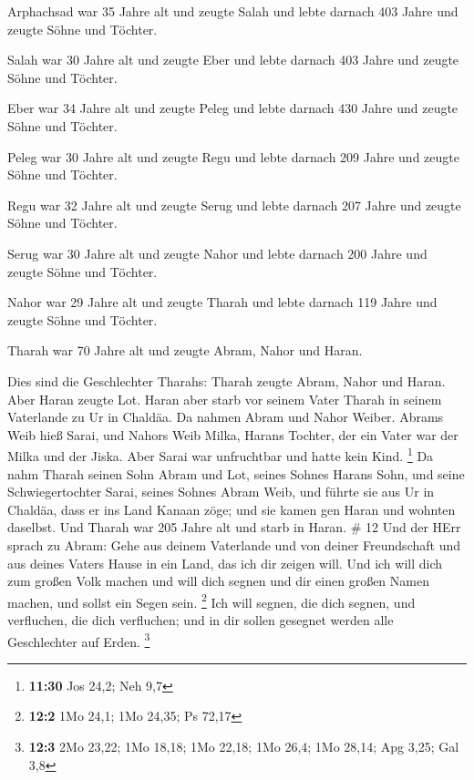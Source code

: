  Arphachsad war 35 Jahre alt und zeugte Salah 
und lebte darnach 403 Jahre und zeugte Söhne und Töchter.

 Salah war 30 Jahre alt und zeugte Eber  und
lebte darnach 403 Jahre und zeugte Söhne und Töchter.

 Eber war 34 Jahre alt und zeugte Peleg  und
lebte darnach 430 Jahre und zeugte Söhne und Töchter.

 Peleg war 30 Jahre alt und zeugte Regu  und
lebte darnach 209 Jahre und zeugte Söhne und Töchter.

 Regu war 32 Jahre alt und zeugte Serug  und
lebte darnach 207 Jahre und zeugte Söhne und Töchter.

 Serug war 30 Jahre alt und zeugte Nahor  und
lebte darnach 200 Jahre und zeugte Söhne und Töchter.

 Nahor war 29 Jahre alt und zeugte Tharah  und
lebte darnach 119 Jahre und zeugte Söhne und Töchter.

 Tharah war 70 Jahre alt und zeugte Abram, Nahor und Haran.

 Dies sind die Geschlechter Tharahs: Tharah zeugte Abram,
Nahor und Haran. Aber Haran zeugte Lot.  Haran aber starb
vor seinem Vater Tharah in seinem Vaterlande zu Ur in Chaldäa.
 Da nahmen Abram und Nahor Weiber. Abrams Weib hieß Sarai,
und Nahors Weib Milka, Harans Tochter, der ein Vater war der Milka und
der Jiska.  Aber Sarai war unfruchtbar und hatte kein Kind.
\footnote{\textbf{11:30} Jos 24,2; Neh 9,7}  Da nahm Tharah
seinen Sohn Abram und Lot, seines Sohnes Harans Sohn, und seine
Schwiegertochter Sarai, seines Sohnes Abram Weib, und führte sie aus Ur
in Chaldäa, dass er ins Land Kanaan zöge; und sie kamen gen Haran und
wohnten daselbst.  Und Tharah war 205 Jahre alt und starb
in Haran. \# 12  Und der HErr sprach zu Abram: Gehe aus
deinem Vaterlande und von deiner Freundschaft und aus deines Vaters
Hause in ein Land, das ich dir zeigen will.  Und ich will
dich zum großen Volk machen und will dich segnen und dir einen großen
Namen machen, und sollst ein Segen sein. \footnote{\textbf{12:2} 1Mo
  24,1; 1Mo 24,35; Ps 72,17}  Ich will segnen, die dich
segnen, und verfluchen, die dich verfluchen; und in dir sollen gesegnet
werden alle Geschlechter auf Erden. \footnote{\textbf{12:3} 2Mo 23,22;
  1Mo 18,18; 1Mo 22,18; 1Mo 26,4; 1Mo 28,14; Apg 3,25; Gal 3,8}

